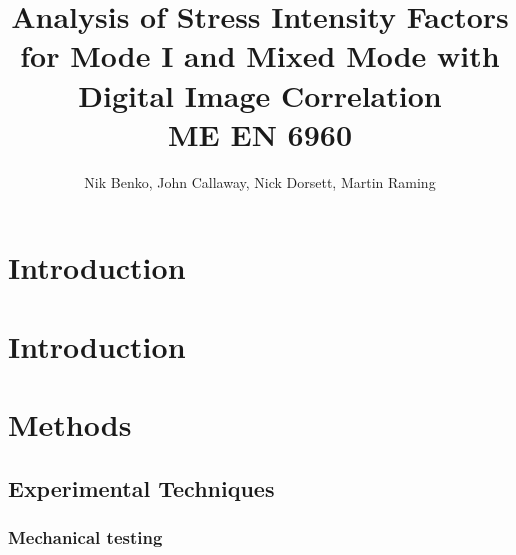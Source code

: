 \documentclass[12pt]{article}
\begin{document}
\title{ Analysis of Stress Intensity Factors for Mode I and Mixed Mode with Digital Image Correlation \\ \normalsize{ME EN 6960}}
\author{Nik Benko, John Callaway, Nick Dorsett, Martin Raming}
\maketitle


\begin{abstract} 

\end{abstract}

\section{Introduction} 

\begin{abstract}%
\end{abstract}

\section{Introduction} %


\section{Methods}

\subsection{Experimental Techniques} 
\subsubsection{Mechanical testing} %
\end{document}
